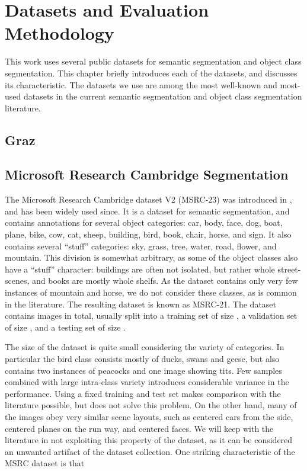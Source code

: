 \chapter{Datasets and Evaluation Methodology}
This work uses several public datasets for semantic segmentation
and object class segmentation. This chapter briefly introduces each of the datasets,
and discusses its characteristic. The datasets we use are among the most well-known
and most-used datasets in the current semantic segmentation and object class segmentation
literature.

\section{Graz}

\section{Microsoft Research Cambridge Segmentation}
The Microsoft Research Cambridge dataset V2 (MSRC-23) was introduced in \citet{shotton2006textonboost}, and
has been widely used since. It is a dataset for semantic segmentation, and contains annotations for
several object categories: car, body, face, dog, boat, plane, bike, cow, cat, sheep,
building, bird, book, chair, horse, and sign. It also contains several ``stuff''
categories: sky, grass, tree, water, road, flower, and mountain.
This division is somewhat arbitrary, as some of the object classes also have a ``stuff'' character:
buildings are often not isolated, but rather whole street-scenes, and books are mostly whole
shelfs.
%
As the dataset contains only very few instances of mountain and horse, we do
not consider these classes, as is common in the literature. The resulting
dataset is known as MSRC-21.
The dataset contains %
images in total, usually split into a training set of size , a validation set of size ,
and a testing set of size .

The size of the dataset is quite small considering the variety of categories. In particular the
bird class consists mostly of ducks, swans and geese, but also contains two instances of peacocks
and one image showing tits. Few samples combined with large intra-class variety introduces considerable
variance in the performance. Using a fixed training and test set makes comparison with the literature possible,
but does not solve this problem.
%
On the other hand, many of the images obey very similar scene layouts, such as centered cars from the side,
centered planes on the run way, and centered faces. We will keep with the literature in not exploiting
this property of the dataset, as it can be considered an unwanted artifact of the dataset collection.
One striking characteristic of the MSRC dataset is that 

